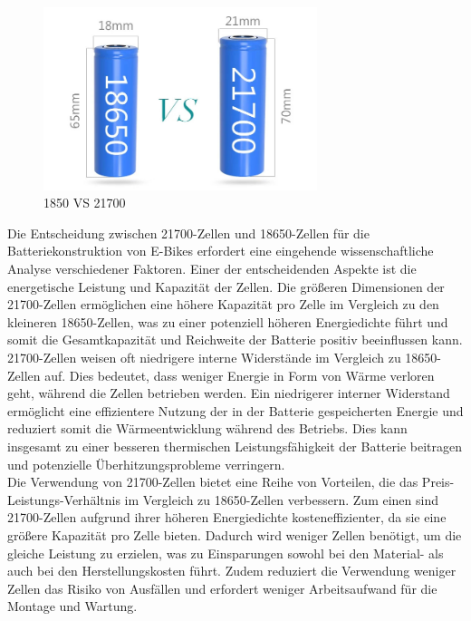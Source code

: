 \begin{figure}[h]
    \centering
    \includegraphics[width=8cm]{images/18650-VS-21700.jpg}
    \caption{1850 VS 21700\cite{Tritek.12132021}}
    \label{fig:1850VS21700}
\end{figure}

Die Entscheidung zwischen 21700-Zellen und 18650-Zellen für die Batteriekonstruktion von E-Bikes erfordert eine eingehende wissenschaftliche Analyse verschiedener Faktoren. Einer der entscheidenden Aspekte ist die energetische Leistung und Kapazität der Zellen. Die größeren Dimensionen der 21700-Zellen ermöglichen eine höhere Kapazität pro Zelle im Vergleich zu den kleineren 18650-Zellen, was zu einer potenziell höheren Energiedichte führt und somit die Gesamtkapazität und Reichweite der Batterie positiv beeinflussen kann.\\

21700-Zellen weisen oft niedrigere interne Widerstände im Vergleich zu 18650-Zellen auf. Dies bedeutet, dass weniger Energie in Form von Wärme verloren geht, während die Zellen betrieben werden. Ein niedrigerer interner Widerstand ermöglicht eine effizientere Nutzung der in der Batterie gespeicherten Energie und reduziert somit die Wärmeentwicklung während des Betriebs. Dies kann insgesamt zu einer besseren thermischen Leistungsfähigkeit der Batterie beitragen und potenzielle Überhitzungsprobleme verringern.\\

Die Verwendung von 21700-Zellen bietet eine Reihe von Vorteilen, die das Preis-Leistungs-Verhältnis im Vergleich zu 18650-Zellen verbessern. Zum einen sind 21700-Zellen aufgrund ihrer höheren Energiedichte kosteneffizienter, da sie eine größere Kapazität pro Zelle bieten. Dadurch wird weniger Zellen benötigt, um die gleiche Leistung zu erzielen, was zu Einsparungen sowohl bei den Material- als auch bei den Herstellungskosten führt. Zudem reduziert die Verwendung weniger Zellen das Risiko von Ausfällen und erfordert weniger Arbeitsaufwand für die Montage und Wartung.\\

